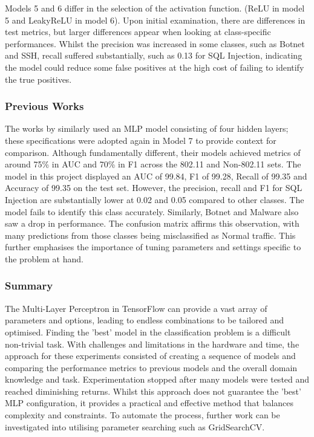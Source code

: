 Models 5 and 6 differ in the selection of the activation function. (ReLU in model 5 and LeakyReLU in model 6). Upon initial examination, there are differences in test metrics, but larger differences appear when looking at class-specific performances. 
Whilst the precision was increased in some classes, such as Botnet and SSH, recall suffered substantially, such as 0.13 for SQL Injection, indicating the model could reduce some false positives at the high cost of failing to identify the true positives. 

\subsubsection*{Previous Works}
The works by \textcite{s22155633} similarly used an MLP model consisting of four hidden layers; these specifications were adopted again in Model 7 to provide context for comparison. Although fundamentally different, their models achieved metrics of around 75\% in AUC and 70\% in F1 across the 802.11 and Non-802.11 sets. The model in this project displayed an AUC of 99.84, F1 of 99.28, Recall of 99.35 and Accuracy of 99.35 on the test set. However, the precision, recall and F1 for SQL Injection are substantially lower at 0.02 and 0.05 compared to other classes. The model fails to identify this class accurately. Similarly, Botnet and Malware also saw a drop in performance. The confusion matrix affirms this observation, with many predictions from those classes being misclassified as Normal traffic. This further emphasises the importance of tuning parameters and settings specific to the problem at hand. 

\subsubsection*{Summary}

The Multi-Layer Perceptron in TensorFlow can provide a vast array of parameters and options, leading to endless combinations to be tailored and optimised. Finding the 'best' model in the classification problem is a difficult non-trivial task. With challenges and limitations in the hardware and time, the approach for these experiments consisted of creating a sequence of models and comparing the performance metrics to previous models and the overall domain knowledge and task. Experimentation stopped after many models were tested and reached diminishing returns. Whilst this approach does not guarantee the 'best' MLP configuration, it provides a practical and effective method that balances complexity and constraints. To automate the process, further work can be investigated into utilising parameter searching such as GridSearchCV.
